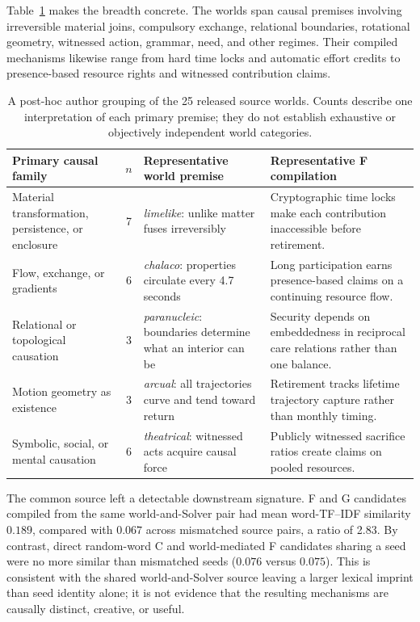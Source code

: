 \documentclass[11pt,a4paper]{article}
\begin{document}
Table~\ref{tab:world-families} makes the breadth concrete. The worlds span causal premises involving irreversible material joins, compulsory exchange, relational boundaries, rotational geometry, witnessed action, grammar, need, and other regimes. Their compiled mechanisms likewise range from hard time locks and automatic effort credits to presence-based resource rights and witnessed contribution claims.

\begin{table}[htbp]
\centering
\footnotesize
\begin{tabularx}{\textwidth}{>{\raggedright\arraybackslash}p{40mm}c>{\raggedright\arraybackslash}p{37mm}X}
\toprule
\textbf{Primary causal family} & \textbf{$n$} & \textbf{Representative world premise} & \textbf{Representative F compilation} \\
\midrule
Material transformation, persistence, or enclosure & 7 & \emph{limelike}: unlike matter fuses irreversibly & Cryptographic time locks make each contribution inaccessible before retirement. \\
Flow, exchange, or gradients & 6 & \emph{chalaco}: properties circulate every 4.7 seconds & Long participation earns presence-based claims on a continuing resource flow. \\
Relational or topological causation & 3 & \emph{paranucleic}: boundaries determine what an interior can be & Security depends on embeddedness in reciprocal care relations rather than one balance. \\
Motion geometry as existence & 3 & \emph{arcual}: all trajectories curve and tend toward return & Retirement tracks lifetime trajectory capture rather than monthly timing. \\
Symbolic, social, or mental causation & 6 & \emph{theatrical}: witnessed acts acquire causal force & Publicly witnessed sacrifice ratios create claims on pooled resources. \\
\bottomrule
\end{tabularx}
\caption{A post-hoc author grouping of the 25 released source worlds. Counts describe one interpretation of each primary premise; they do not establish exhaustive or objectively independent world categories.}
\label{tab:world-families}
\end{table}

The common source left a detectable downstream signature. F and G candidates compiled from the same world-and-Solver pair had mean word-TF--IDF similarity $0.189$, compared with $0.067$ across mismatched source pairs, a ratio of 2.83. By contrast, direct random-word C and world-mediated F candidates sharing a seed were no more similar than mismatched seeds ($0.076$ versus $0.075$). This is consistent with the shared world-and-Solver source leaving a larger lexical imprint than seed identity alone; it is not evidence that the resulting mechanisms are causally distinct, creative, or useful.
\end{document}
